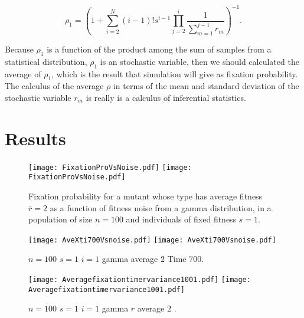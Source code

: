 \begin{equation}
\rho_1=\left(1 + \sum\limits_{i=2}^{N}{(i-1)!s^{i-1}\prod\limits_{j=2}^{i}{\frac{1}{\sum\limits_{m=1}^{j-1}r_m}}}\right)^{-1}.
\end{equation}

Because $\rho_{1}$ is a function of the product among the sum of samples from a statistical distribution, $\rho_{1}$ is an stochastic variable, then we should calculated the average of $\rho_{1}$, which is the result that  simulation will give as fixation probability. The calculus of the average $\rho$ in terms of the mean and standard deviation  of the stochastic variable $r_{m}$ is really is a calculus of inferential statistics.
\section{Results}
\begin{figure}[H]
  \begin{center}
    \leavevmode
    \ifpdf
      \texttt{[image: FixationProVsNoise.pdf]}
    \else
      \texttt{[image: FixationProVsNoise.pdf]}
    \fi
    \caption{Fixation probability for a mutant whose type has average fitness $\bar r=2$ as a function of fitness noise from a gamma distribution, in a population of size $n=100$ and individuals of fixed fitness $s=1$.}
    \label{}
  \end{center}
  \end{figure}
  
  
\begin{figure}[H]
  \begin{center}
    \leavevmode
    \ifpdf
      \texttt{[image: AveXti700Vsnoise.pdf]}
    \else
      \texttt{[image: AveXti700Vsnoise.pdf]}
    \fi
    \caption{$n=100$ $s=1$ $i=1$ gamma average $2$ Time $700$.}
    \label{}
  \end{center}
  \end{figure}
  
  \begin{figure}[H]
  \begin{center}
    \leavevmode
    \ifpdf
      \texttt{[image: Averagefixationtimervariance1001.pdf]}
    \else
      \texttt{[image: Averagefixationtimervariance1001.pdf]}
    \fi
    \caption{$n=100$ $s=1$ $i=1$ gamma $r$ average $2$ .}
    \label{}
  \end{center}
  \end{figure}
  
